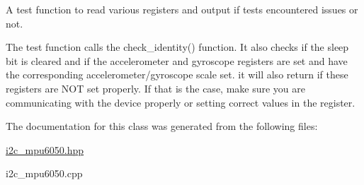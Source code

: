 A test function to read various registers and output if tests encountered issues or not. 

The test function calls the check\+\_\+identity() function. It also checks if the sleep bit is cleared and if the accelerometer and gyroscope registers are set and have the corresponding accelerometer/gyroscope scale set. it will also return if these registers are N\+OT set properly. If that is the case, make sure you are communicating with the device properly or setting correct values in the register.  

The documentation for this class was generated from the following files\+:\begin{DoxyCompactItemize}
\item 
\mbox{\hyperlink{i2c__mpu6050_8hpp}{i2c\+\_\+mpu6050.\+hpp}}\item 
i2c\+\_\+mpu6050.\+cpp\end{DoxyCompactItemize}
